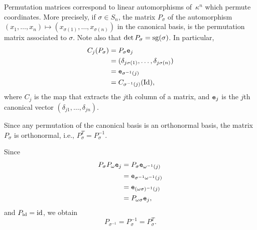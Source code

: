\begin{rem}
    Permutation matrices correspond to linear automorphisms of~$\kappa^n$ which permute coordinates. More precisely, if $\sigma\in S_n$, the matrix $P_\sigma$ of the automorphism $(x_1,\dots,x_n)\mapsto(x_{\sigma(1)},\dots,x_{\sigma(n)})$ in the canonical basis, is the permutation matrix associated to $\sigma$. Note also that $\det P_{\sigma}=\operatorname{sg}(\sigma)$. In particular,
    \begin{align*}
        C_j(P_\sigma) &= P_\sigma\mathtt e_j\\
            &= (\delta_{j\sigma(1)},\dots,\delta_{j\sigma(n)})\\
            &= \mathtt e_{\sigma^{-1}(j)}\\
            &= C_{\sigma^{-1}(j)}(\operatorname{Id}),
    \end{align*}
    where $C_j$ is the map that extracts the $j$th column of a matrix, and $\mathtt e_j$ is the $j$th canonical vector $(\delta_{j1},\dots,\delta_{jn})$.

    Since any permutation of the canonical basis is an orthonormal basis, the matrix $P_\sigma$ is orthonormal, i.e., $P_\sigma^T=P_\sigma^{-1}$.

    Since
    \begin{align*}
        P_\sigma P_\omega\mathtt e_j
            &= P_\sigma\mathtt e_{\omega^{-1}(j)}\\
            &= \mathtt e_{\sigma^{-1}\omega^{-1}(j)}\\
            &= \mathtt e_{(\omega\sigma)^{-1}(j)}\\
            &= P_{\omega\sigma}\mathtt e_j,
    \end{align*}
    and $P_{\operatorname{id}}=\operatorname{id}$, we obtain
    $$
        P_{\sigma^{-1}}=P_\sigma^{-1}=P_\sigma^T.
    $$
\end{rem}

